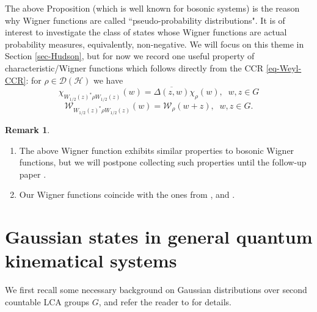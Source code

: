 \documentclass[12pt,reqno]{amsart}
\theoremstyle{definition}
\theoremstyle{definition}
\theoremstyle{definition}
\newtheorem{rem}[thm]{Remark}
\numberwithin{thm}{section}
\numberwithin{equation}{section}
\newcommand{\D}{\mathcal{D}}
\newcommand{\Hi}{\mathcal{H}}
\begin{document}
The above Proposition (which is well known for bosonic systems) is the reason why Wigner functions are called ``pseudo-probability distributions". It is of interest to investigate the class of states whose Wigner functions are actual probability measures, equivalently, non-negative. We will focus on this theme in Section \ref{sec-Hudson}, but for now we record one useful property of characteristic/Wigner functions which follows directly from the CCR \eqref{eq-Weyl-CCR}: for $\rho\in \D(\Hi)$ we have
\begin{equation} \label{eq-chftnclifford}
    \chi_{W_{1/2}(z)^*\rho W_{1/2}(z)}(w)=\overline{\Delta(z,w)}\chi_{\rho}(w),\;\; w,z \in G
\end{equation}
\begin{equation} \label{eq-wignerclifford}
    \mathcal{W}_{W_{1/2}(z)^*\rho W_{1/2}(z)}(w)=\mathcal{W}_{\rho}(w+z),\;\; w, z\in G.
\end{equation}


\begin{rem}${}$
    \begin{enumerate}
        \item The above Wigner function exhibits similar properties to bosonic Wigner functions, but we will postpone collecting such properties until the follow-up paper \cite{GQIT2}.
        
        \item Our Wigner functions coincide with the ones from \cite{Mukunda1979}, \cite{rigas2010non} and \cite{Gro}.
    \end{enumerate}
\end{rem}




\section{Gaussian states in general quantum kinematical systems}\label{sec:Gaussian}

We first recall some necessary background on Gaussian distributions over second countable LCA groups $G$, and refer the reader to \cite{Feldman} for details.
\end{document}
